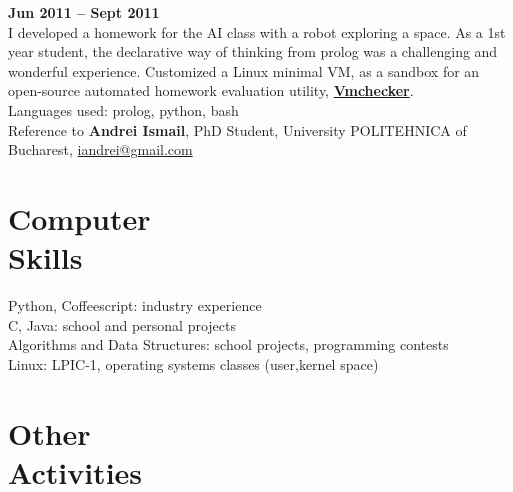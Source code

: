 \documentclass[margin,line]{resume}
\begin{document}
\begin{resume}
		\hfill \textbf{Jun 2011 -- Sept 2011}\vspace{1.2mm}\\
	I developed a homework for the AI class with a robot exploring a space. As a 1st year student, the declarative way of thinking from prolog was a challenging and wonderful experience. Customized a Linux minimal VM, as a sandbox for an open-source automated homework evaluation utility, \href{https://elf.cs.pub.ro/vmchecker/ui/?locale=en}{\textbf{Vmchecker}}.\vspace{1.2mm}\\
	Languages used: prolog, python, bash\vspace{1.2mm}\\
	Reference to \textbf{Andrei Ismail}, PhD Student, University POLITEHNICA of Bucharest, \href{mailto:iandrei@gmail.com}{iandrei@gmail.com}

    \section{\mysidestyle Computer\\Skills}

	Python, Coffeescript: industry experience\\
	C, Java: school and personal projects\\
	Algorithms and Data Structures: school projects, programming contests\\
	Linux: LPIC-1, operating systems classes (user,kernel space)


    \section{\mysidestyle Other\\Activities}


\end{resume}
\end{document}
